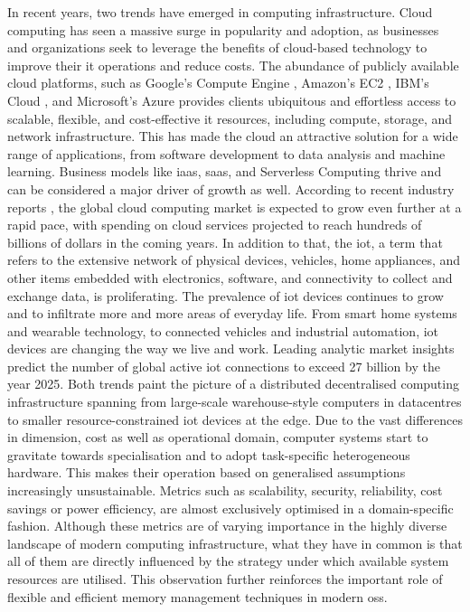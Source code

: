 In recent years, two trends have emerged in computing infrastructure.
Cloud computing has seen a massive surge in popularity and adoption, as businesses and organizations seek to leverage the benefits of cloud-based technology to improve their \ac{it} operations and reduce costs.
The abundance of publicly available cloud platforms, such as Google’s Compute Engine \cite{google-compute-engine}, Amazon’s EC2 \cite{aws-ec2}, IBM’s Cloud \cite{ibm-cloud}, and Microsoft’s Azure \cite{microsoft-azure} provides clients ubiquitous and effortless access to scalable, flexible, and cost-effective \ac{it} resources, including compute, storage, and network infrastructure.
This has made the cloud an attractive solution for a wide range of applications, from software development to data analysis and machine learning.
Business models like \ac{iaas}, \ac{saas}, and Serverless Computing thrive and can be considered a major driver of growth as well.
According to recent industry reports \cite{gartner2022}, the global cloud computing market is expected to grow even further at a rapid pace, with spending on cloud services projected to reach hundreds of billions of dollars in the coming years.
In addition to that, the \ac{iot}, a term that refers to the extensive network of physical devices, vehicles, home appliances, and other items embedded with electronics, software, and connectivity to collect and exchange data, is proliferating.
The prevalence of \ac{iot} devices continues to grow and to infiltrate more and more areas of everyday life.
From smart home systems and wearable technology, to connected vehicles and industrial automation, \ac{iot} devices are changing the way we live and work.
Leading analytic market insights \cite{iotanalytics2022} predict the number of global active \ac{iot} connections to exceed 27 billion by the year 2025.
Both trends paint the picture of a distributed decentralised computing infrastructure spanning from large-scale warehouse-style computers in datacentres to smaller resource-constrained \ac{iot} devices at the edge.
Due to the vast differences in dimension, cost as well as operational domain, computer systems start to gravitate towards specialisation and to adopt task-specific heterogeneous hardware.
This makes their operation based on generalised assumptions increasingly unsustainable.
Metrics such as scalability, security, reliability, cost savings or power efficiency, are almost exclusively optimised in a domain-specific fashion.
Although these metrics are of varying importance in the highly diverse landscape of modern computing infrastructure, what they have in common is that all of them are directly influenced by the strategy under which available system resources are utilised.
This observation further reinforces the important role of flexible and efficient memory management techniques in modern \acp{os}.

